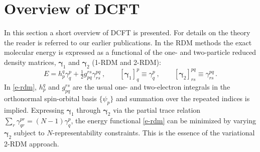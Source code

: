 \section{Overview of DCFT}
In this section a short overview of DCFT is presented. For details on the theory
the reader is referred to our earlier
publications.\cite{Simmonett:2010p174122,Sokolov:2013p024107,Sokolov:2013p204110}
In the RDM methods\cite{Mazziotti:2007} the exact molecular energy is expressed
as a functional of the one- and two-particle reduced density matrices,
$\boldsymbol{\gamma}_1$ and $\boldsymbol{\gamma}_2$ (1-RDM and 2-RDM):
\begin{equation}
	\label{e-rdm}
	E
    = 
	h_p^q
    \gamma_q^p
    +
    \tfrac{1}{2}
    g_{pq}^{rs}
    \gamma_{rs}^{pq} \ ,
	\qquad
	[\boldsymbol{\gamma}_1]_q^p
    \equiv
    \gamma_q^p \ , 
	\qquad
	[\boldsymbol{\gamma}_2]_{rs}^{pq}
    \equiv
    \gamma_{rs}^{pq}\,.
\end{equation}
In \cref{e-rdm}, $h_p^q$ and $g_{pq}^{rs}$ are the usual one- and two-electron
integrals in the orthonormal spin-orbital basis $\{\psi_p\}$ and summation over
the repeated indices is implied.
Expressing $\boldsymbol{\gamma}_1$ through $\boldsymbol{\gamma}_2$ via
the partial trace relation $\sum_r\gamma_{qr}^{pr}=(N-1)\gamma_q^p$, the energy
functional \eqref{e-rdm} can be minimized by varying $\boldsymbol{\gamma}_2$
subject to $N$-representability constraints.
This is the essence of the variational 2-RDM approach.\cite{Mazziotti:2007}


